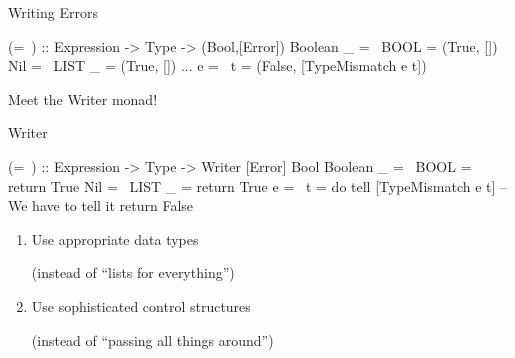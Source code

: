 \begin{frame}[fragile]{Writing Errors}

  \begin{block}{}
    \begin{HASKELL}
      (=~) :: Expression -> Type -> (Bool,[Error])
      Boolean _ =~ BOOL   = (True, [])
      Nil       =~ LIST _ = (True, [])
      ...
      e         =~ t      = (False, [TypeMismatch e t])
    \end{HASKELL}
  \end{block}

  Meet the Writer monad!

  \begin{block}{Writer}
    \begin{HASKELL}
      (=~) :: Expression -> Type -> Writer [Error] Bool
      Boolean _ =~ BOOL   = return True
      Nil       =~ LIST _ = return True
      e         =~ t      = do
        tell [TypeMismatch e t] -- We have to tell it
        return False
    \end{HASKELL}
  \end{block}

\end{frame}






  \begin{enumerate}
    \item Use appropriate data types

          (instead of ``lists for everything'')

    \bigskip

    \item Use sophisticated control structures

          (instead of ``passing all things around'')
  \end{enumerate}

